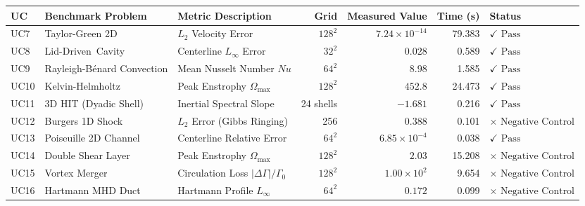 \begin{tabular}{lllrrrl}
\toprule
\textbf{UC} & \textbf{Benchmark Problem} & \textbf{Metric Description} & \textbf{Grid} & \textbf{Measured Value} & \textbf{Time (s)} & \textbf{Status} \\
\midrule
  UC7 & Taylor-Green 2D & $L_2$ Velocity Error & $128^2$ & $7.24 \times 10^{-14}$ & 79.383 & $\checkmark \text{ Pass}$ \\
  UC8 & \mbox{Lid-Driven Cavity} & Centerline $L_\infty$ Error & $32^2$ & $0.028$ & 0.589 & $\checkmark \text{ Pass}$ \\
  UC9 & Rayleigh-Bénard Convection & Mean Nusselt Number $Nu$ & $64^2$ & $8.98$ & 1.585 & $\checkmark \text{ Pass}$ \\
  UC10 & Kelvin-Helmholtz & Peak Enstrophy $\Omega_{\max}$ & $128^2$ & $452.8$ & 24.473 & $\checkmark \text{ Pass}$ \\
  UC11 & 3D HIT (Dyadic Shell) & Inertial Spectral Slope & 24 shells & $-1.681$ & 0.216 & $\checkmark \text{ Pass}$ \\
  UC12 & Burgers 1D Shock & $L_2$ Error (Gibbs Ringing) & 256 & $0.388$ & 0.101 & $\times \text{ Negative Control}$ \\
  UC13 & Poiseuille 2D Channel & Centerline Relative Error & $64^2$ & $6.85 \times 10^{-4}$ & 0.038 & $\checkmark \text{ Pass}$ \\
  UC14 & Double Shear Layer & Peak Enstrophy $\Omega_{\max}$ & $128^2$ & $2.03$ & 15.208 & $\times \text{ Negative Control}$ \\
  UC15 & Vortex Merger & Circulation Loss $|\Delta\Gamma|/\Gamma_0$ & $128^2$ & $1.00 \times 10^{2}$ & 9.654 & $\times \text{ Negative Control}$ \\
  UC16 & Hartmann MHD Duct & Hartmann Profile $L_\infty$ & $64^2$ & $0.172$ & 0.099 & $\times \text{ Negative Control}$ \\
\bottomrule
\end{tabular}